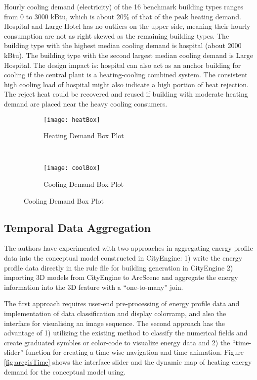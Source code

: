\documentclass[hidelinks,12pt]{article}
\newcommand{\fref}[1]{Figure \ref{#1}}
\begin{document}
Hourly cooling demand (electricity) of the 16 benchmark building types
ranges from 0 to 3000 kBtu, which is about 20\% of that of the peak
heating demand. Hospital and Large Hotel has no outliers on the upper
side, meaning their hourly consumption are not as right skewed as the
remaining building types. The building type with the highest median
cooling demand is hospital (about 2000 kBtu). The building type with
the second largest median cooling demand is Large Hospital. The design
impact is: hospital can also act as an anchor building for cooling if
the central plant is a heating-cooling combined system. The consistent
high cooling load of hospital might also indicate a high portion of
heat rejection. The reject heat could be recovered and reused if
building with moderate heating demand are placed near the heavy
cooling consumers.

\begin{figure}[h!]
  \centering
  \begin{subfigure}
  \centering
  \texttt{[image: heatBox]}
  \caption{Heating Demand Box Plot}
  \label{fig:heatBox}
  \end{subfigure}%
  ~
  \begin{subfigure}
  \centering
  \texttt{[image: coolBox]}
  \caption{Cooling Demand Box Plot}
  \label{fig:coolBox}
  \end{subfigure}
\end{figure}   

\subsection{Temporal Data Aggregation}
The authors have experimented with two approaches in aggregating
energy profile data into the conceptual model constructed in
CityEngine: 1) write the energy profile data directly in the rule file
for building generation in CityEngine 2) importing 3D models from
CityEngine to ArcScene and aggregate the energy information into the
3D feature with a ``one-to-many'' join.

The first approach requires user-end pre-processing of energy profile
data and implementation of data classification and display colorramp,
and also the interface for visualising an image sequence. The second
approach has the advantage of 1) utilizing the existing method to
classify the numerical fields and create graduated symbles or
color-code to visualize energy data and 2) the ``time-slider''
function for creating a time-wise navigation and
time-animation. \fref{fig:arcgisTime} shows the interface slider and
the dynamic map of heating energy demand for the conceptual model
using.
\end{document}
